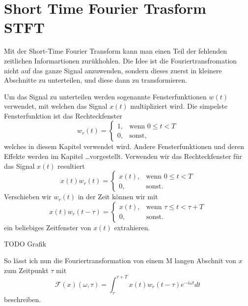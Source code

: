 %
%
%
%
\section{Short Time Fourier Trasform STFT\label{sonogramm:section:teil0}}
Mit der Short-Time Fourier Transform kann man einen Teil der fehlenden zeitlichen Informartionen zurükhohlen.
Die Idee ist die Fouriertransfromation nicht auf das ganze Signal anzuwenden, sondern dieses zuerst in kleinere
Abschnitte zu unterteilen, und diese dann zu transformieren.

Um das Signal zu unterteilen werden sogenannte Fensterfunktionen $w(t)$ verwendet, mit welchen das Signal
$x(t)$ multipliziert wird.
Die simpelste Fensterfunktion ist das Rechteckfenster
\begin{equation}
    w_r(t) = 
        \begin{cases}
        1,& \text{wenn } 0 \le t < T\\
        0, & \text{sonst, }
        \end{cases}
\end{equation}
welches in diesem Kapitel verwendet wird.
Andere Fensterfunktionen und deren Effekte werden im Kapitel \dots vorgestellt.
Verwenden wir das Rechteckfenster für das Signal $x(t)$ resultiert 
\begin{equation}
    x(t) w_r(t) = 
    \begin{cases}
    x(t),& \text{wenn } 0 \le t < T\\
    0, & \text{sonst.}
    \end{cases}
\end{equation}
Verschieben wir $w_r(t)$ in der Zeit können wir mit 
\begin{equation}
    x(t) w_r(t-\tau) = 
    \begin{cases}
        x(t),& \text{wenn } \tau \le t < \tau + T\\
        0, & \text{sonst.}
    \end{cases}
\end{equation}
ein beliebiges Zeitfenster von $x(t)$ extrahieren.

TODO Grafik

So lässt ich nun die Fouriertransformation von einem M langen Abschnit
von $x$ zum Zeitpunkt $\tau$ mit
\begin{equation}
    \mathscr{F}(x)(\omega, \tau) = \int_{\tau}^{\tau+T} x(t) w_r(t - \tau) e^{-i \omega t} dt
\end{equation}
beschreiben.

